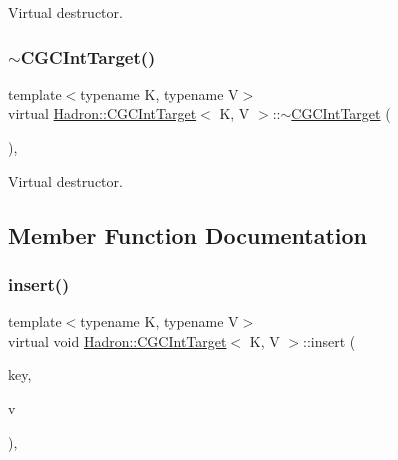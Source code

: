 Virtual destructor. 

\mbox{\label{classHadron_1_1CGCIntTarget_a6b808ca161d3dae62109495144178541}} 
\subsubsection{\texorpdfstring{$\sim$CGCIntTarget()}{~CGCIntTarget()}\hspace{0.1cm}{\footnotesize\ttfamily [2/2]}}
{\footnotesize\ttfamily template$<$typename K, typename V$>$ \\
virtual \mbox{\hyperlink{classHadron_1_1CGCIntTarget}{Hadron\+::\+C\+G\+C\+Int\+Target}}$<$ K, V $>$\+::$\sim$\mbox{\hyperlink{classHadron_1_1CGCIntTarget}{C\+G\+C\+Int\+Target}} (\begin{DoxyParamCaption}{ }\end{DoxyParamCaption})\hspace{0.3cm}{\ttfamily [inline]}, {\ttfamily [virtual]}}



Virtual destructor. 



\subsection{Member Function Documentation}
\mbox{\label{classHadron_1_1CGCIntTarget_a2c1e2eaf068abdc394ba3326c7770e77}} 
\subsubsection{\texorpdfstring{insert()}{insert()}\hspace{0.1cm}{\footnotesize\ttfamily [1/2]}}
{\footnotesize\ttfamily template$<$typename K, typename V$>$ \\
virtual void \mbox{\hyperlink{classHadron_1_1CGCIntTarget}{Hadron\+::\+C\+G\+C\+Int\+Target}}$<$ K, V $>$\+::insert (\begin{DoxyParamCaption}\item[{const \mbox{\hyperlink{structHadron_1_1CGCKeyType}{C\+G\+C\+Key\+Type}}$<$ K $>$ \&}]{key,  }\item[{const V \&}]{v }\end{DoxyParamCaption})\hspace{0.3cm}{\ttfamily [inline]}, {\ttfamily [virtual]}}

